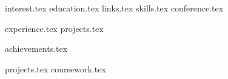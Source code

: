 \documentclass[]{deedy-resume-openfont}
\newcommand*{\pgonecolone}{pg_1_column_1/}
\newcommand*{\pgonecoltwo}{pg_1_column_2/}
\newcommand*{\pgtwocolone}{pg_2_column_1/}
\newcommand*{\pgtwocoltwo}{pg_2_column_2/}
\begin{document}
%
%


%
%



%
%

\begin{minipage}[t]{0.33\textwidth} 

{interest.tex}
{education.tex}
{links.tex}
{skills.tex}
{conference.tex}


%
%

\end{minipage} 
\hfill
\begin{minipage}[t]{0.65\textwidth} 

{experience.tex}
{projects.tex}

\end{minipage} 


%
%

\begin{minipage}[t]{0.33\textwidth} 

{achievements.tex}


%
%

\end{minipage} 
\hfill
\begin{minipage}[t]{0.65\textwidth} 

{projects.tex}
{coursework.tex}

\end{minipage} 
\end{document}
